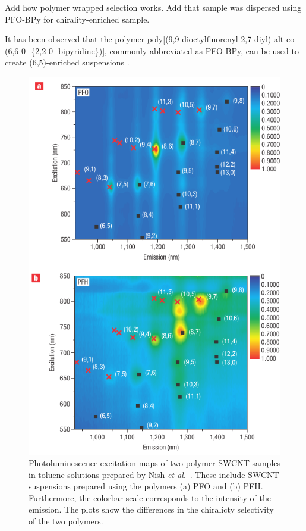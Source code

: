 {\color{red} Add how polymer wrapped selection works. Add that sample was dispersed using PFO-BPy for chirality-enriched sample.}

It has been observed that the polymer poly[(9,9-dioctylfluorenyl-2,7-diyl)-alt-co-(6,6 0 -\{2,2 0 -bipyridine\})], commonly abbreviated as PFO-BPy, can be used to create (6,5)-enriched suspensions \cite{hertel2010diffusion, ozawa2011one, gomulya2013conjugated}.

\begin{figure}[H]
	\centering
	\includegraphics[scale=2.3]{images/chapter_methods/pl_nish_3}
	\caption{Photoluminescence excitation maps of two polymer-SWCNT samples in toluene solutions prepared by Nish \textit{et al}.\ \cite{nish2007highly}. These include SWCNT suspensions prepared using the polymers (a) PFO and (b) PFH. Furthermore, the colorbar scale corresponds to the intensity of the emission. The plots show the differences in the chiralicty selectivity of the two polymers.
	}
	\label{fig:map_nish}
\end{figure}


